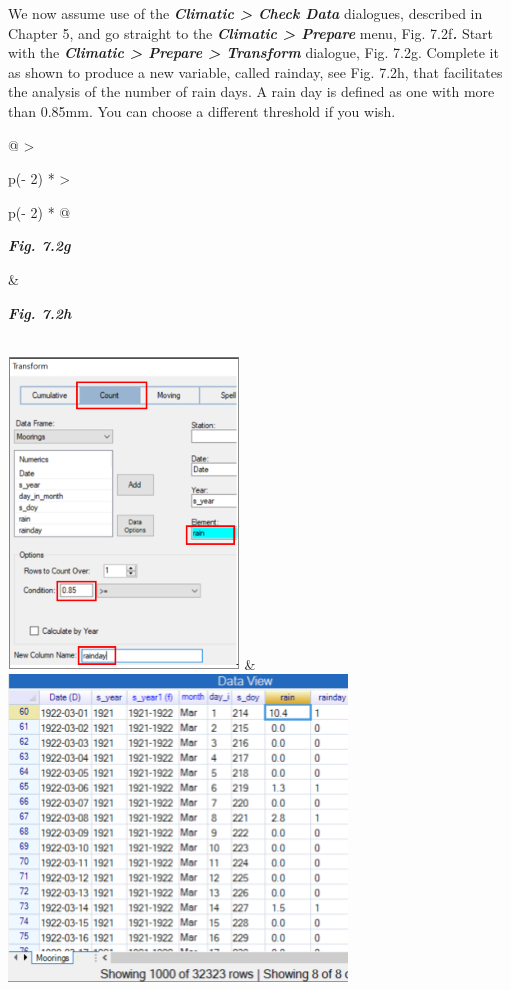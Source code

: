 \documentclass[
  letterpaper,
  DIV=11,
  numbers=noendperiod]{scrreprt}
\begin{document}
We now assume use of the \textbf{\emph{Climatic \textgreater{} Check
Data}} dialogues, described in Chapter 5, and go straight to the
\textbf{\emph{Climatic \textgreater{} Prepare}} menu, Fig.
7.2f\textbf{\emph{.}} Start with the \textbf{\emph{Climatic
\textgreater{} Prepare \textgreater{} Transform}} dialogue, Fig. 7.2g.
Complete it as shown to produce a new variable, called rainday, see Fig.
7.2h, that facilitates the analysis of the number of rain days. A rain
day is defined as one with more than 0.85mm. You can choose a different
threshold if you wish.

\begin{longtable}[]{@{}
  >{\raggedright\arraybackslash}p{(\columnwidth - 2\tabcolsep) * }
  >{\raggedright\arraybackslash}p{(\columnwidth - 2\tabcolsep) * }@{}}
\toprule\noalign{}
\begin{minipage}[b]{\linewidth}\raggedright
\textbf{\emph{Fig. 7.2g}}
\end{minipage} & \begin{minipage}[b]{\linewidth}\raggedright
\textbf{\emph{Fig. 7.2h}}
\end{minipage} \\
\midrule\noalign{}
\endhead
\bottomrule\noalign{}
\endlastfoot
\includegraphics[width=2.41476in,height=3.25756in]{figures/Fig7.2g.png}
&
\includegraphics[width=3.54285in,height=3.20519in]{figures/Fig7.2h.png} \\
\end{longtable}
\end{document}
